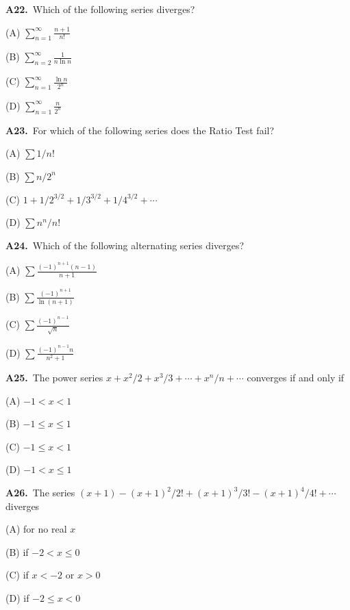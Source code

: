 \documentclass[11pt]{article}
\begin{document}
\bigskip\noindent\textbf{A22.}\ Which of the following series diverges?
\begin{list}{}{\setlength{\leftmargin}{3em}\setlength{\labelwidth}{2.5em}\setlength{\itemsep}{0pt}\setlength{\topsep}{2pt}}
\item[(A)] $\sum_{n=1}^\infty\frac{n+1}{n!}$
\item[(B)] $\sum_{n=2}^\infty\frac1{n\ln n}$
\item[(C)] $\sum_{n=1}^\infty\frac{\ln n}{2^n}$
\item[(D)] $\sum_{n=1}^\infty\frac n{2^n}$
\end{list}

\bigskip\noindent\textbf{A23.}\ For which of the following series does the Ratio Test fail?
\begin{list}{}{\setlength{\leftmargin}{3em}\setlength{\labelwidth}{2.5em}\setlength{\itemsep}{0pt}\setlength{\topsep}{2pt}}
\item[(A)] $\sum1/n!$
\item[(B)] $\sum n/2^n$
\item[(C)] $1+1/2^{3/2}+1/3^{3/2}+1/4^{3/2}+\cdots$
\item[(D)] $\sum n^n/n!$
\end{list}

\bigskip\noindent\textbf{A24.}\ Which of the following alternating series diverges?
\begin{list}{}{\setlength{\leftmargin}{3em}\setlength{\labelwidth}{2.5em}\setlength{\itemsep}{0pt}\setlength{\topsep}{2pt}}
\item[(A)] $\sum\frac{(-1)^{n+1}(n-1)}{n+1}$
\item[(B)] $\sum\frac{(-1)^{n+1}}{\ln(n+1)}$
\item[(C)] $\sum\frac{(-1)^{n-1}}{\sqrt n}$
\item[(D)] $\sum\frac{(-1)^{n-1}n}{n^2+1}$
\end{list}

\bigskip\noindent\textbf{A25.}\ The power series $x+x^2/2+x^3/3+\cdots+x^n/n+\cdots$ converges if and only if
\begin{list}{}{\setlength{\leftmargin}{3em}\setlength{\labelwidth}{2.5em}\setlength{\itemsep}{0pt}\setlength{\topsep}{2pt}}
\item[(A)] $-1<x<1$
\item[(B)] $-1\leq x\leq 1$
\item[(C)] $-1\leq x<1$
\item[(D)] $-1<x\leq 1$
\end{list}

\bigskip\noindent\textbf{A26.}\ The series $(x+1)-(x+1)^2/2!+(x+1)^3/3!-(x+1)^4/4!+\cdots$ diverges
\begin{list}{}{\setlength{\leftmargin}{3em}\setlength{\labelwidth}{2.5em}\setlength{\itemsep}{0pt}\setlength{\topsep}{2pt}}
\item[(A)] for no real $x$
\item[(B)] if $-2<x\leq0$
\item[(C)] if $x<-2$ or $x>0$
\item[(D)] if $-2\leq x<0$
\end{list}
\end{document}
